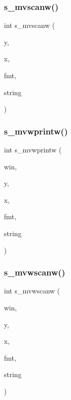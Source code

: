 \subsubsection{\texorpdfstring{s\+\_\+mvscanw()}{s\_mvscanw()}}
{\footnotesize\ttfamily int s\+\_\+mvscanw (\begin{DoxyParamCaption}\item[{int}]{y,  }\item[{int}]{x,  }\item[{char $\ast$}]{fmt,  }\item[{char $\ast$}]{string }\end{DoxyParamCaption})}

\mbox{\label{C-macros_8c_a34a56ec22fc3813b4971c20eb6d699ff}} 
\subsubsection{\texorpdfstring{s\+\_\+mvwprintw()}{s\_mvwprintw()}}
{\footnotesize\ttfamily int s\+\_\+mvwprintw (\begin{DoxyParamCaption}\item[{W\+I\+N\+D\+OW $\ast$}]{win,  }\item[{int}]{y,  }\item[{int}]{x,  }\item[{const char $\ast$}]{fmt,  }\item[{char $\ast$}]{string }\end{DoxyParamCaption})}

\mbox{\label{C-macros_8c_ad40ae826be88925237db3a46518ca603}} 
\subsubsection{\texorpdfstring{s\+\_\+mvwscanw()}{s\_mvwscanw()}}
{\footnotesize\ttfamily int s\+\_\+mvwscanw (\begin{DoxyParamCaption}\item[{W\+I\+N\+D\+OW $\ast$}]{win,  }\item[{int}]{y,  }\item[{int}]{x,  }\item[{char $\ast$}]{fmt,  }\item[{char $\ast$}]{string }\end{DoxyParamCaption})}

